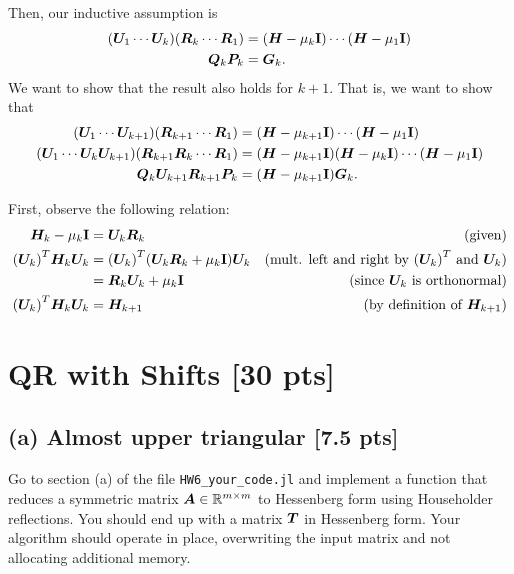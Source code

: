 \documentclass[twoside,10pt]{article}
\begin{document}
Then, our inductive assumption is
\begin{align*}
  \left(\mtx{U}_1 \cdots \mtx{U}_k\right)\left(\mtx{R}_k \cdots \mtx{R}_1\right) &= \left(\mtx{H} - \mu_k \Id\right) \cdots \left(\mtx{H} - \mu_1 \Id\right)\\
  \mtx{Q}_k\mtx{P}_k &= \mtx{G}_k.
\end{align*}
We want to show that the result also holds for $k+1$.
That is, we want to show that
\begin{align*}
  \left(\mtx{U}_1 \cdots \mtx{U}_{k+1}\right)\left(\mtx{R}_{k+1} \cdots \mtx{R}_1\right) &= \left(\mtx{H} - \mu_{k+1} \Id\right) \cdots \left(\mtx{H} - \mu_1 \Id\right)\\
  \left(\mtx{U}_1 \cdots \mtx{U}_{k} \mtx{U}_{k+1}\right)\left(\mtx{R}_{k+1} \mtx{R}_{k} \cdots \mtx{R}_1\right) &=  \left(\mtx{H} - \mu_{k+1} \Id\right) \left(\mtx{H} - \mu_k \Id\right) \cdots \left(\mtx{H} - \mu_1 \Id\right)\\
  \mtx{Q}_k \mtx{U}_{k+1}\mtx{R}_{k+1} \mtx{P}_k &= \left(\mtx{H} - \mu_{k+1} \Id\right) \mtx{G}_k.
\end{align*}

First, observe the following relation:
\begin{align*}
  \mtx{H}_k - \mu_k \Id &= \mtx{U}_k \mtx{R}_k&\text{(given)}\\
  \left(\mtx{U}_k\right)^T \mtx{H}_k \mtx{U}_k &=\left(\mtx{U}_k\right)^T \left(\mtx{U}_k \mtx{R}_k + \mu_k \Id\right) \mtx{U}_k&\text{(mult. left and right by $\left(\mtx{U}_k\right)^T$ and $\mtx{U}_k$)}\\
  &= \mtx{R}_k \mtx{U}_k + \mu_k \Id&\text{(since $\mtx{U}_k$ is orthonormal)}\\
  \left(\mtx{U}_k\right)^T \mtx{H}_k \mtx{U}_k &= \mtx{H}_{k+1}&\text{(by definition of $\mtx{H}_{k+1}$)}
\end{align*}


\section{QR with Shifts [30 pts]}
\subsection*{(a) Almost upper triangular [7.5 pts]} 
Go to section (a) of the file \texttt{HW6\_your\_code.jl} and implement a function that reduces a symmetric matrix $\bm{A} \in \mathbb{R}^{m\times m}$ to Hessenberg form using Householder reflections. You should end up with a matrix $\bm{T}$ in Hessenberg form. Your algorithm should operate in place, overwriting the input matrix and not allocating additional memory. 
\end{document}
